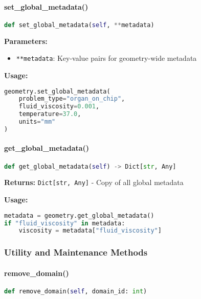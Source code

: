 \paragraph{set\_global\_metadata()}
\begin{lstlisting}[language=Python, caption=Set Global Metadata Method]
def set_global_metadata(self, **metadata)
\end{lstlisting}

\textbf{Parameters:}
\begin{itemize}
    \item \texttt{**metadata}: Key-value pairs for geometry-wide metadata
\end{itemize}

\textbf{Usage:}
\begin{lstlisting}[language=Python]
geometry.set_global_metadata(
    problem_type="organ_on_chip",
    fluid_viscosity=0.001,
    temperature=37.0,
    units="mm"
)
\end{lstlisting}

\paragraph{get\_global\_metadata()}
\begin{lstlisting}[language=Python, caption=Get Global Metadata Method]
def get_global_metadata(self) -> Dict[str, Any]
\end{lstlisting}

\textbf{Returns:} \texttt{Dict[str, Any]} - Copy of all global metadata

\textbf{Usage:}
\begin{lstlisting}[language=Python]
metadata = geometry.get_global_metadata()
if "fluid_viscosity" in metadata:
    viscosity = metadata["fluid_viscosity"]
\end{lstlisting}

\subsubsection{Utility and Maintenance Methods}

\paragraph{remove\_domain()}
\begin{lstlisting}[language=Python, caption=Remove Domain Method]
def remove_domain(self, domain_id: int)
\end{lstlisting}

